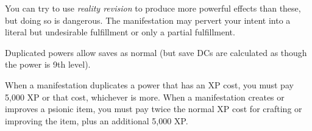 {	You can try to use \emph{reality revision} to produce more powerful effects than these, but doing so is dangerous. The manifestation may pervert your intent into a literal but undesirable fulfillment or only a partial fulfillment.

	Duplicated powers allow saves as normal (but save DCs are calculated as though the power is 9th level).

	When a manifestation duplicates a power that has an XP cost, you must pay 5,000 XP or that cost, whichever is more. When a manifestation creates or improves a psionic item, you must pay twice the normal XP cost for crafting or improving the item, plus an additional 5,000 XP.
}